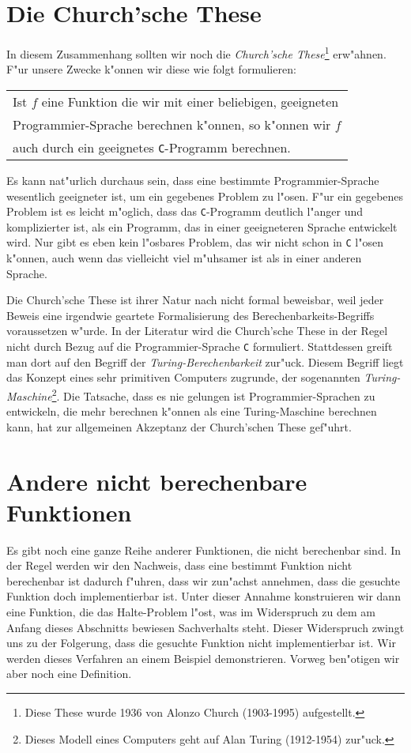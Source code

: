 \section{Die Church'sche These}
In diesem Zusammenhang sollten wir noch die \emph{Church'sche These}\footnote{
Diese These wurde 1936 von Alonzo Church (1903-1995) aufgestellt.} erw"ahnen.  F"ur unsere Zwecke k"onnen wir diese wie folgt formulieren:
\begin{center}
\begin{tabular}{|l|}
 \hline
 \hline
    \rule{0pt}{14pt}
    Ist $f$ eine Funktion die wir mit einer beliebigen, geeigneten \\
    Programmier-Sprache berechnen k"onnen, so k"onnen wir $f$ \\
        auch durch ein geeignetes  \texttt{C}-Programm 
    berechnen.     
    \rule[-6pt]{0pt}{14pt}
    \\
 \hline
 \hline
\end{tabular}
\end{center}
Es kann nat"urlich durchaus sein, dass eine bestimmte Programmier-Sprache wesentlich
geeigneter ist, um ein gegebenes Problem zu l"osen.  F"ur ein gegebenes Problem ist es
leicht m"oglich, dass das \texttt{C}-Programm deutlich l"anger und komplizierter
ist, als ein Programm, das in einer geeigneteren Sprache entwickelt wird.  Nur gibt es
eben kein l"osbares Problem, das wir nicht schon in \texttt{C} l"osen k"onnen, auch wenn das
vielleicht viel m"uhsamer ist als in einer anderen Sprache.

Die Church'sche These ist ihrer Natur nach nicht formal beweisbar, weil jeder Beweis eine
irgendwie geartete Formalisierung des Berechenbarkeits-Begriffs voraussetzen w"urde.  
In der Literatur wird die Church'sche These in der Regel nicht durch Bezug auf die
Programmier-Sprache \texttt{C} formuliert. Stattdessen greift man dort auf den Begriff der
\emph{Turing-Berechenbarkeit}  zur"uck.  Diesem Begriff liegt das Konzept eines sehr
primitiven Computers zugrunde, der sogenannten \emph{Turing-Maschine}\footnote{
Dieses Modell eines Computers geht auf Alan Turing (1912-1954) zur"uck.}.
  Die Tatsache, dass es nie gelungen ist Programmier-Sprachen
zu entwickeln, die mehr berechnen k"onnen als eine Turing-Maschine berechnen kann, hat
zur allgemeinen Akzeptanz der Church'schen These gef"uhrt.

\section{Andere nicht berechenbare Funktionen}
Es gibt noch eine ganze Reihe anderer Funktionen, die nicht berechenbar sind.  In der
Regel werden wir den Nachweis, dass eine bestimmt Funktion nicht berechenbar ist dadurch f"uhren, dass
wir zun"achst annehmen, dass die gesuchte Funktion doch implementierbar ist.  Unter dieser Annahme
konstruieren wir dann eine Funktion, die das Halte-Problem l"ost, was im Widerspruch zu dem am Anfang dieses Abschnitts
bewiesen Sachverhalts steht.
Dieser Widerspruch zwingt uns zu der Folgerung, dass die gesuchte Funktion nicht implementierbar ist.
Wir werden dieses Verfahren an einem Beispiel demonstrieren. Vorweg ben"otigen wir aber
noch eine Definition.

